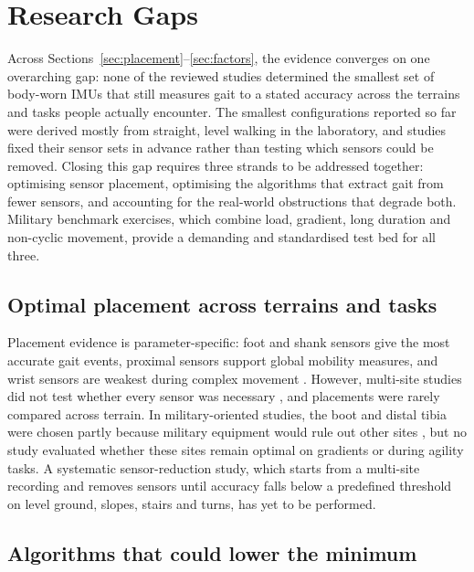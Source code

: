 \documentclass[10pt,a4paper,twocolumn]{article}
\begin{document}
\FloatBarrier

\section{Research Gaps}
\label{sec:gaps}

Across Sections~\ref{sec:placement}--\ref{sec:factors}, the evidence converges on one overarching gap: none of the reviewed studies determined the smallest set of body-worn IMUs that still measures gait to a stated accuracy across the terrains and tasks people actually encounter. The smallest configurations reported so far were derived mostly from straight, level walking in the laboratory, and studies fixed their sensor sets in advance rather than testing which sensors could be removed. Closing this gap requires three strands to be addressed together: optimising sensor placement, optimising the algorithms that extract gait from fewer sensors, and accounting for the real-world obstructions that degrade both. Military benchmark exercises, which combine load, gradient, long duration and non-cyclic movement, provide a demanding and standardised test bed for all three.

\subsection{Optimal placement across terrains and tasks}

Placement evidence is parameter-specific: foot and shank sensors give the most accurate gait events, proximal sensors support global mobility measures, and wrist sensors are weakest during complex movement \citep{mico2023,anderson2025}. However, multi-site studies did not test whether every sensor was necessary \citep{carcreff2020,lin2023}, and placements were rarely compared across terrain. In military-oriented studies, the boot and distal tibia were chosen partly because military equipment would rule out other sites \citep{fain2024b,slattery2024}, but no study evaluated whether these sites remain optimal on gradients or during agility tasks. A systematic sensor-reduction study, which starts from a multi-site recording and removes sensors until accuracy falls below a predefined threshold on level ground, slopes, stairs and turns, has yet to be performed.

\subsection{Algorithms that could lower the minimum}
\end{document}
